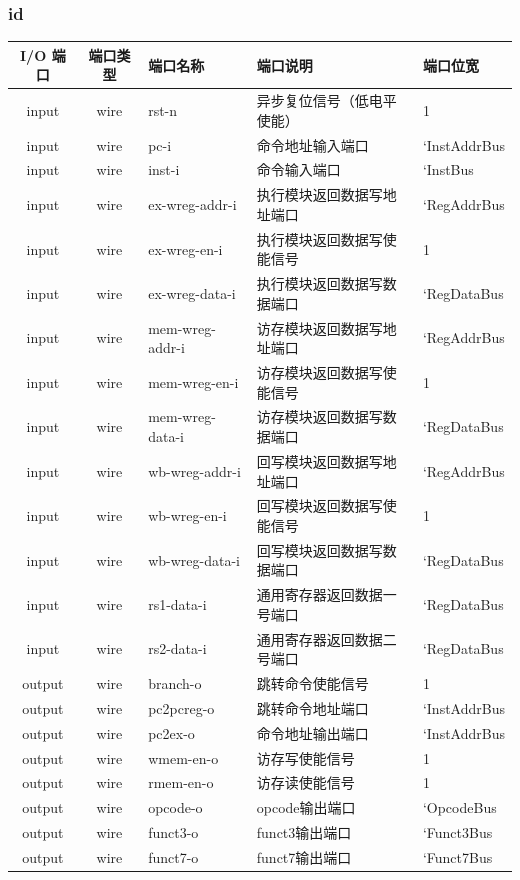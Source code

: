 \documentclass[lang=cn,11pt,a4paper]{elegantpaper}
\begin{document}
\subsubsection{id}
\begin{tabular}{cclll}
	\toprule
	I/O 端口 & 端口类型 &端口名称&端口说明 &端口位宽\\
	\midrule
	input &wire& rst-n & 异步复位信号（低电平使能） & 1 \\
	input &wire& pc-i & 命令地址输入端口       & `InstAddrBus  \\
	input &wire&inst-i & 命令输入端口 & `InstBus  \\
	input &wire& ex-wreg-addr-i & 执行模块返回数据写地址端口 & `RegAddrBus \\
	input &wire& ex-wreg-en-i & 执行模块返回数据写使能信号 & 1  \\
	input &wire& ex-wreg-data-i  & 执行模块返回数据写数据端口 & `RegDataBus  \\
	input &wire& mem-wreg-addr-i & 访存模块返回数据写地址端口 & `RegAddrBus \\
	input &wire& mem-wreg-en-i & 访存模块返回数据写使能信号 & 1  \\
	input &wire& mem-wreg-data-i  & 访存模块返回数据写数据端口 & `RegDataBus  \\
	input &wire& wb-wreg-addr-i & 回写模块返回数据写地址端口 & `RegAddrBus \\
	input &wire& wb-wreg-en-i & 回写模块返回数据写使能信号 & 1  \\
	input &wire& wb-wreg-data-i  & 回写模块返回数据写数据端口 & `RegDataBus  \\
	input &wire& rs1-data-i  & 通用寄存器返回数据一号端口 & `RegDataBus  \\
	input &wire& rs2-data-i  & 通用寄存器返回数据二号端口 & `RegDataBus  \\
	output &wire& branch-o & 跳转命令使能信号    & 1   \\
	output &wire& pc2pcreg-o & 跳转命令地址端口    &  `InstAddrBus   \\
	output &wire& pc2ex-o & 命令地址输出端口    & `InstAddrBus   \\
	output &wire& wmem-en-o & 访存写使能信号    & 1   \\
	output &wire& rmem-en-o & 访存读使能信号    & 1   \\
	output &wire& opcode-o & opcode输出端口    & `OpcodeBus   \\
	output &wire& funct3-o & funct3输出端口    & `Funct3Bus   \\
	output &wire& funct7-o & funct7输出端口    & `Funct7Bus   \\

\end{tabular}
\end{document}

